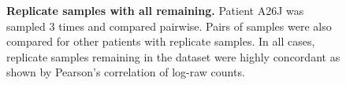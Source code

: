 \begin{figure}[!ht]
\begin{center}
%
%
    \end{center}
    \caption[Replicate samples with all remaining]{\small \textbf{Replicate samples with all remaining.} Patient A26J was sampled 3 times and compared pairwise. Pairs of samples were also compared for other patients with replicate samples.  In all cases, replicate samples remaining in the dataset were highly concordant as shown by Pearson's correlation of log-raw counts.
}
\label{fig:rep_keepkeep}
\end{figure}

\FloatBarrier

